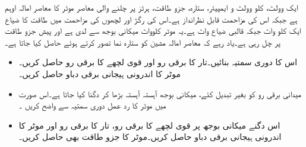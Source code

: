 %
ایک  وولٹ،  کلو وولٹ و ایمپیئر، ستارہ،  جزو طاقت،  ہرٹز پر چلنے والی معاصر موٹر کا معاصر امالہ  اوہم  ہے جبکہ اس کی مزاحمت قابل نظرانداز ہے۔اس کی رگڑ اور لچھوں کی مزاحمت میں طاقت کا ضیاع ایک کلو واٹ جبکہ قالبی ضیاع  واٹ ہے۔یہ موٹر   کلوواٹ میکانی بوجھ سے لدی  ہے اور    پیش جزو طاقت   پر چل رہی ہے۔یاد رہے کہ معاصر امالہ مشین کو ستارہ نما تصور کرتے ہوئے حاصل کیا جاتا ہے۔ 
\begin{itemize}
\item
اس کا دوری سمتیہ بنائیں۔تار کا برقی رو  اور قوی لچھے کا برقی رو   حاصل کریں۔موٹر کا اندرونی ہیجانی برقی دباو  حاصل کریں۔
\item
میدانی برقی رو کو بغیر تبدیل کئے،  میکانی بوجھ آہستہ آہستہ بڑھا کر دگنا کیا جاتا ہے۔اس صورت میں موٹر کا رد عمل دوری سمتیہ سے واضح کریں ۔
\item
اس دگنے میکانی بوجھ پر قوی لچھے  کا برقی رو،  تار کا برقی رو  اور موٹر کا اندرونی ہیجانی برقی دباو حاصل کریں۔موٹر کا جزو طاقت بھی حاصل کریں۔
\end{itemize}

